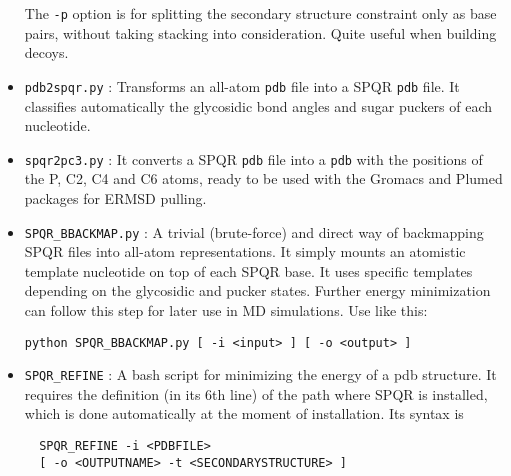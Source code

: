 \documentclass{article}
\begin{document}
\begin{itemize}
The \texttt{-p} option is for splitting the secondary structure constraint only as base pairs, without taking stacking into consideration. Quite useful when building decoys.

\item \texttt{pdb2spqr.py} : Transforms an all-atom \texttt{pdb} file into a SPQR \texttt{pdb} file. It classifies automatically the glycosidic bond angles and sugar puckers of each nucleotide.

\item \texttt{spqr2pc3.py} : It converts a SPQR \texttt{pdb} file into a \texttt{pdb} with the positions of the P, C2, C4 and C6 atoms, ready to be used with the Gromacs and Plumed packages for ERMSD pulling.

\item \texttt{SPQR\_BBACKMAP.py} : A trivial (brute-force) and direct way of backmapping SPQR files into all-atom representations. It simply mounts an atomistic template nucleotide on top of each SPQR base. It uses specific templates depending on the glycosidic and pucker states. Further energy minimization can follow this step for later use in MD simulations. Use like this:
\begin{verbatim}
python SPQR_BBACKMAP.py [ -i <input> ] [ -o <output> ]
\end{verbatim}

\item \texttt{SPQR\_REFINE} : A bash script for minimizing the energy of a pdb structure. It requires the definition (in its 6th line) of the path where SPQR is installed, which is done automatically at the moment of installation. Its syntax is
\begin{verbatim}
  SPQR_REFINE -i <PDBFILE>
  [ -o <OUTPUTNAME> -t <SECONDARYSTRUCTURE> ]
\end{verbatim}


\end{itemize}
\end{document}
